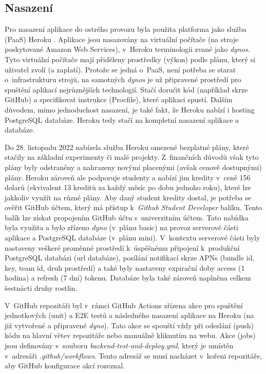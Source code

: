 \documentclass[thesis=M,czech]{FITthesis}[2019/12/23]
\begin{document}
\subsection{Nasazení}
Pro nasazení aplikace do ostrého provozu byla použita platforma jako služba (PaaS) Heroku \cite{heroku}. Aplikace jsou nasazovány na virtuální počítače (na stroje poskytované Amazon Web Services), v~Heroku terminologii zvané jako \textit{dynos}. Tyto virtuální počítače mají přiděleny prostředky (výkon) podle plánu, který si uživatel zvolí (a zaplatí). Protože se jedná o~PaaS, není potřeba se starat o~infrastrukturu strojů, na samotných \textit{dynos} je už připravené prostředí pro spuštění aplikací nejrůznějších technologií. Stačí doručit kód (například skrze GitHub) a specifikovat instrukce (Procfile), které aplikaci spustí. Dalším důvodem, mimo jednoduchost nasazení, je také fakt, že Heroku nabízí i hosting PostgreSQL databáze. Heroku tedy stačí na kompletní nasazení aplikace a databáze.

Do 28. listopadu 2022 nabízela služba Heroku omezené bezplatné plány, které stačily na základní experimenty či malé projekty. Z~finančních důvodů však tyto plány byly odstraněny a nahrazeny novými placenými (avšak cenově dostupnými) plány. Heroku zároveň ale podporuje studenty a nabízí jim kredity v~ceně 156 dolarů (ekvivalent 13 kreditů za každý měsíc po dobu jednoho roku), které lze jakkoliv využít na různé plány. Aby daný student kredity dostal, je potřeba se ověřit GitHub účtem, který má přístup k~\textit{Github Student Developer} balíku. Tento balík lze získat propojením GitHub účtu s~univerzitním účtem. Tato nabídka byla využita a bylo zřízeno \textit{dyno} (v~plánu basic) na provoz serverové části aplikace a PostgreSQL databáze (v~plánu mini). V~kontextu serverové části byly nastaveny veškeré proměnné prostředí k~úspěšnému připojení k~produkční PostgreSQL databázi (url databáze), posílání notifikací skrze APNs (bundle id, key, team id, druh prostředí) a také byly nastaveny expirační doby access (1 hodina) a refresh (7 dní) tokenu. Databáze byla také zároveň naplněna celkem šestnácti druhy rostlin.

V~GitHub repozitáři byl v~rámci GitHub Actions zřízena akce pro spuštění jednotkových (unit) a E2E testů a následného nasazení aplikace na Heroku (na již vytvořené a připravené \textit{dyno}). Tato akce se spouští vždy při odeslání (push) kódu na hlavní větev repozitáře nebo manuálně kliknutím na webu. Akce (jobs) jsou definovány v~souboru \textit{backend-test-and-deploy.yml}, který je umístěn v~adresáři \textit{.github/workflows}. Tento adresář se musí nacházet v~kořeni repozitáře, aby GitHub konfigurace akcí rozeznal.
\end{document}
